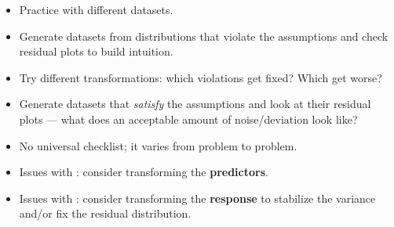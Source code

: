 \begin{remark}
\end{remark}

\begin{itemize}
    \item Practice with different datasets.
    \item Generate datasets from distributions that violate the assumptions and check
    residual plots to build intuition.
    \item Try different transformations: which violations get fixed? Which get worse?
    \item Generate datasets that \emph{satisfy} the assumptions and look at their residual
    plots --- what does an acceptable amount of noise/deviation look like?
\end{itemize}

\begin{itemize}
    \item No universal checklist; it varies from problem to problem.
    \item Issues with : consider transforming the \textbf{predictors}.
    \item Issues with : consider transforming the
    \textbf{response} to stabilize the variance and/or fix the residual distribution.
\end{itemize}

